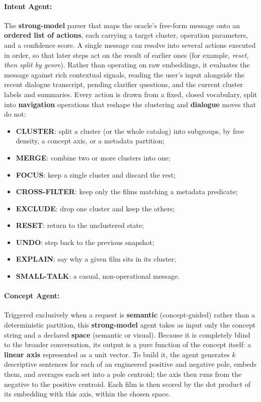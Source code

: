 \paragraph{Intent Agent:} The \textbf{strong-model} parser that maps the oracle's free-form message onto an \textbf{ordered list of actions}, each carrying a target cluster, operation parameters, and a confidence score.
A single message can resolve into several actions executed in order, so that later steps act on the result of earlier ones (for example, \emph{reset, then split by genre}).
Rather than operating on raw embeddings, it evaluates the message against rich contextual signals, reading the user's input alongside the recent dialogue transcript, pending clarifier questions, and the current cluster labels and summaries.
Every action is drawn from a fixed, closed vocabulary, split into \textbf{navigation} operations that reshape the clustering and \textbf{dialogue} moves that do not:
\begin{itemize}[leftmargin=1.4em]
  \item \textbf{CLUSTER}: split a cluster (or the whole catalog) into subgroups, by free density, a concept axis, or a metadata partition;
  \item \textbf{MERGE}: combine two or more clusters into one;
  \item \textbf{FOCUS}: keep a single cluster and discard the rest;
  \item \textbf{CROSS-FILTER}: keep only the films matching a metadata predicate;
  \item \textbf{EXCLUDE}: drop one cluster and keep the others;
  \item \textbf{RESET}: return to the unclustered state;
  \item \textbf{UNDO}: step back to the previous snapshot;
  \item \textbf{EXPLAIN}: say why a given film sits in its cluster;
  \item \textbf{SMALL-TALK}: a casual, non-operational message.
\end{itemize}

\paragraph{Concept Agent:} Triggered exclusively when a request is \textbf{semantic} (concept-guided) rather than a deterministic partition, this \textbf{strong-model} agent takes as input only the concept string and a declared \textbf{space} (semantic or visual).
Because it is completely blind to the broader conversation, its output is a pure function of the concept itself: a \textbf{linear axis} represented as a unit vector.
To build it, the agent generates $k$ descriptive sentences for each of an engineered positive and negative pole, embeds them, and averages each set into a pole centroid; the axis then runs from the negative to the positive centroid.
Each film is then scored by the dot product of its embedding with this axis, within the chosen space.

